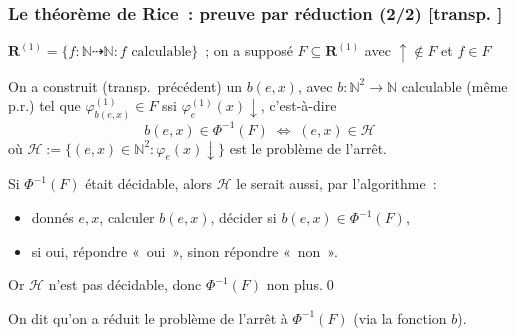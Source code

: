 \documentclass[mathserif,a4paper,aspectratio=169]{beamer}
\renewcommand{\frametitle}[1]{\subsubsection*{#1 {\footnotesize[transp. \insertframenumber]}}}
\begin{document}
\begin{frame}
\frametitle{Le théorème de Rice : preuve par réduction (2/2)}

{\footnotesize $\textbf{R}^{(1)} = \{f \colon
  \mathbb{N}\dasharrow\mathbb{N} : f\text{~calculable}\}$ ; on a
  supposé $F \subseteq \textbf{R}^{(1)}$ avec ${\uparrow}\not\in F$
  et $f \in F$\par}

\smallskip

On a construit (transp. précédent) un $b(e,x)$, avec $b \colon
\mathbb{N}^2 \to \mathbb{N}$ calculable (même p.r.) tel que
$\varphi^{(1)}_{b(e,x)} \in F$ ssi $\varphi^{(1)}_e(x)\downarrow$,
c'est-à-dire
\[
b(e,x) \in \Phi^{-1}(F) \;\Longleftrightarrow\; (e,x) \in \mathscr{H}
\]
où $\mathscr{H} := \{(e,x)\in\mathbb{N}^2 : \varphi_e(x)\downarrow\}$
est le problème de l'arrêt.

\medskip

Si $\Phi^{-1}(F)$ était décidable, alors $\mathscr{H}$ le serait aussi, par
l'algorithme :
\begin{itemize}
\item donnés $e,x$, calculer $b(e,x)$, décider si $b(e,x) \in \Phi^{-1}(F)$,
\item si oui, répondre « oui », sinon répondre « non ».
\end{itemize}

\smallskip

Or $\mathscr{H}$ n'est pas décidable, donc $\Phi^{-1}(F)$ non plus.\qed

\bigskip

On dit qu'on a \alert{réduit le problème de l'arrêt} à $\Phi^{-1}(F)$
(\alert{via} la fonction $b$).

\end{frame}
%
\end{document}

